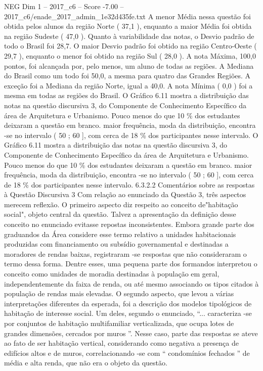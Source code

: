 \begin{textsample}{NEG Dim 1 – 2017\_c6 – Score -7.00 – 2017\_c6/enade\_2017\_admin\_1e32d435fe.txt}
A menor Média nessa questão foi obtida pelos alunos da região Norte ( 37,1 ), enquanto a maior Média foi obtida na região Sudeste ( 47,0 ).
Quanto à variabilidade das notas, o Desvio padrão de todo o Brasil foi 28,7.
O maior Desvio padrão foi obtido na região Centro-Oeste ( 29,7 ), enquanto o menor foi obtido na região Sul ( 28,0 ).
A nota Máxima, 100,0 pontos, foi alcançada por, pelo menos, um aluno de todas as regiões.
A Mediana do Brasil como um todo foi 50,0, a mesma para quatro das Grandes Regiões.
A exceção foi a Mediana da região Norte, igual a 40,0.
A nota Mínima ( 0,0 ) foi a mesma em todas as regiões do Brasil.
O Gráfico 6.11 mostra a distribuição das notas na questão discursiva 3, do Componente de Conhecimento Específico da área de Arquitetura e Urbanismo.
Pouco menos do que 10 \% dos estudantes deixaram a questão em branco. maior frequência, moda da distribuição, encontra -se no intervalo ( 50 ; 60 ], com cerca de 18 \% dos participantes nesse intervalo.
O Gráfico 6.11 mostra a distribuição das notas na questão discursiva 3, do Componente de Conhecimento Específico da área de Arquitetura e Urbanismo.
Pouco menos do que 10 \% dos estudantes deixaram a questão em branco. maior frequência, moda da distribuição, encontra -se no intervalo ( 50 ; 60 ], com cerca de 18 \% dos participantes nesse intervalo. 6.3.2.2 Comentários sobre as respostas à Questão Discursiva 3 Com relação ao enunciado da Questão 3, três aspectos merecem reflexão.
O primeiro aspecto diz respeito ao conceito de"habitação social", objeto central da questão.
Talvez a apresentação da definição desse conceito no enunciado evitasse repostas inconsistentes.
Embora grande parte dos graduandos da Área considere esse termo relativo a unidades habitacionais produzidas com financiamento ou subsídio governamental e destinadas a moradores de rendas baixas, registraram -se respostas que não consideraram o termo dessa forma.
Dentre esses, uma pequena parte dos formandos interpretou o conceito como unidades de moradia destinadas à população em geral, independentemente da faixa de renda, ou até mesmo associando os tipos citados à população de rendas mais elevadas.
O segundo aspecto, que levou a várias interpretações diferentes da esperada, foi a descrição dos modelos tipológicos de habitação de interesse social.
Um deles, segundo o enunciado, “... caracteriza -se por conjuntos de habitação multifamiliar verticalizada, que ocupa lotes de grandes dimensões, cercados por muros ”.
Nesse caso, parte das respostas se ateve ao fato de ser habitação vertical, considerando como negativa a presença de edifícios altos e de muros, correlacionando -se com “ condomínios fechados ” de média e alta renda, que não era o objeto da questão.

\end{textsample}

